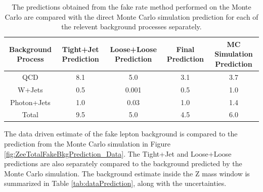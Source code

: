 \documentclass{cmspaper}
\begin{document}
\begin{table}[!ht]
\begin{center}
\begin{tabular}{|c|c|c|c|c|}
\hline
 Background Process                  &  Tight+Jet Prediction  & Loose+Loose Prediction  & Final Prediction & MC Simulation Prediction \\
\hline
 QCD                                 & 8.1                    & 5.0                     & 3.1              & 3.7                     \\ 
 W+Jets                              & 0.5                    & 0.001                   & 0.5              &  1.0                    \\ 
 Photon+Jets                         & 1.0                    & 0.03                    & 1.0              & 1.4                     \\ 
\hline
 Total                               & 9.5                    & 5.0                     & 4.5              & 6.0                     \\ 
\hline
\end{tabular}
\caption{The predictions obtained from the fake rate method performed on the Monte Carlo are compared with the direct Monte Carlo simulation prediction for each of the relevent background processes separately. \label{tab:mcPrediction}}
\end{center}
\end{table}




The data driven estimate of the fake lepton background is compared to the prediction from the Monte Carlo simulation in Figure \ref{fig:ZeeTotalFakeBkgPrediction_Data}. The Tight+Jet and Loose+Loose predictions are also separately compared to the background predicted by the Monte Carlo simulation. The background estimate inside the Z mass window is summarized in Table \ref{tab:dataPrediction}, along with the uncertainties. 
\end{document}
